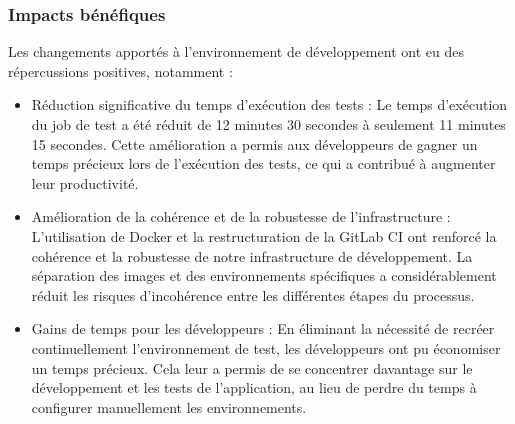 \subsubsection{Impacts bénéfiques}
Les changements apportés à l'environnement de développement ont eu des répercussions positives, notamment :
\begin{itemize}
    \item Réduction significative du temps d'exécution des tests : Le temps d'exécution du job de test a été réduit de 12 minutes 30 secondes à seulement 11 minutes 15 secondes.
    Cette amélioration a permis aux développeurs de gagner un temps précieux lors de l'exécution des tests, ce qui a contribué à augmenter leur productivité.
    \item Amélioration de la cohérence et de la robustesse de l'infrastructure : L'utilisation de Docker et la restructuration de la GitLab CI ont renforcé la cohérence et la robustesse de notre infrastructure de développement.
    La séparation des images et des environnements spécifiques a considérablement réduit les risques d'incohérence entre les différentes étapes du processus.
    \item Gains de temps pour les développeurs : En éliminant la nécessité de recréer continuellement l'environnement de test, les développeurs ont pu économiser un temps précieux.
    Cela leur a permis de se concentrer davantage sur le développement et les tests de l'application, au lieu de perdre du temps à configurer manuellement les environnements.
\end{itemize}
